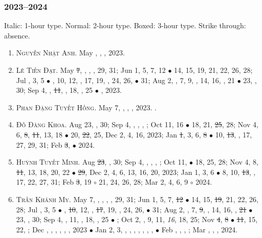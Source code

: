 \documentclass{article}
\begin{document}
\subsubsection{2023--2024}
Italic: 1-hour type. Normal: 2-hour type. Boxed: 3-hour type. Strike through: absence.
\begin{enumerate}
	\item \textsc{Nguyễn Nhật Anh.} {\sf[In]} May , , , 2023. {\sf[Out]}
	\item \textsc{Lê Tiến Đạt.} May \st{7}, , , , 29, 31; Jun 1, 5, 7, 12 $\bullet$ 14, 15, 19, 21, 22, 26, 28; Jul , 3, 5 $\bullet$ , 10, 12, , 17, 19, , 24, 26,  $\bullet$ 31; Aug 2, , 7, 9, , 14, 16, , 21 $\bullet$ 23, , 30; Sep 4, , \st{11}, , 18, , 25 $\bullet$ , 2023. {\sf[Out]}
	\item \textsc{Phan Đặng Tuyết Hồng.} May 7, , , , 2023. {}. {\sf[Out]}
	\item \textsc{Đỗ Đăng Khoa.} {\sf[In]} Aug 23, , 30; Sep 4, , , , ; Oct 11, 16 $\bullet$ 18, 21, \st{25}, 28; Nov 4, 6, \st{8}, \st{11}, 13, 18 $\bullet$ 20, \st{22}, 25, Dec 2, 4, 16, 2023; Jan \st{1}, 3, 6, \st{8} $\bullet$ 10, \st{13}, , 17, 27, 29, 31; Feb \st{3}, $\bullet$ 2024.
	\item \textsc{Huỳnh Tuyết Minh.} {\sf[In]} Aug \st{23}, , 30; Sep 4, , , , ; Oct 11,  $\bullet$ 18, 25, 28; Nov 4, 8, \st{11}, 13, 18, 20, 22 $\bullet$ \st{29}, Dec 2, 4, 6, 13, 16, 20, 2023; Jan 1, 3, 6 $\bullet$ 8, 10, \st{13}, , 17, 22, 27, 31; Feb \st{3}, 19 $\circ$ 21, 24, 26, 28; Mar 2, 4, 6, 9 $\circ$ 2024.
	\item \textsc{Trần Khánh My.} May 7, , , , , 29, 31; Jun 1, 5, 7, \st{12} $\bullet$ 14, 15, \st{19}, 21, 22, 26, 28; Jul , 3, 5 $\bullet$ , \st{10}, 12, , \st{17}, 19, , 24, 26,  $\bullet$ 31; Aug 2, , 7, \st{9}, , 14, 16, , \st{21} $\bullet$ 23, , 30; Sep 4, , 11, , 18, , 25 $\bullet$ ; Oct 2, , 9, 11, {\it16}, 18, 25; Nov \st{4}, \st{8} $\bullet$ \st{11}, 15, 22, ; Dec , , , , , , 2023 $\bullet$ Jan 2, 3, , , , , , , ,  $\bullet$ Feb , , , ; Mar , , , 2024.

\end{enumerate}
\end{document}
